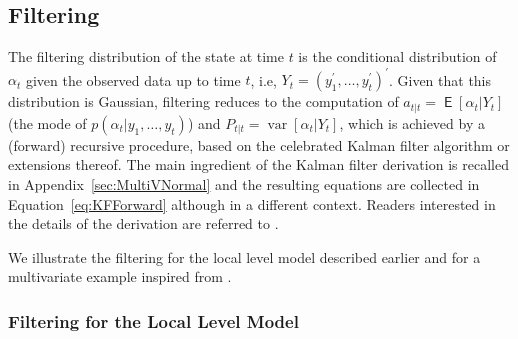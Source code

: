 \documentclass{article}
\DeclareMathOperator{\var}{var}
\DeclareMathOperator{\E}{\mathsf{E}}
\begin{document}
\subsection{Filtering}

The filtering distribution of the state at time $t$ is the conditional distribution of
$\alpha_t$ given the observed data up to time $t$, i.e,
$Y_t=(y_1^\prime,\dots,y_t^\prime)^\prime$. Given that this distribution is Gaussian,
filtering reduces to the computation of $a_{t|t}=\E[\alpha_t|Y_t]$ (the mode of
$p(\alpha_t|y_1,\dots,y_t)$) and $P_{t|t}=\var[\alpha_t|Y_t]$, which is achieved by a
(forward) recursive procedure, based on the celebrated Kalman filter algorithm or extensions
thereof.  The main ingredient of the Kalman filter derivation is recalled in
Appendix~\ref{sec:MultiVNormal} and the resulting equations are collected in
Equation~\eqref{eq:KFForward} although in a different context. Readers interested in the
details of the derivation are referred to \citet[chap. 4]{durbin2012time}.

We illustrate the filtering for the local level model described earlier and for a
multivariate example inspired from \citet[chap. 3.3.2]{petris2009dynamic}.

\subsubsection{Filtering for the Local Level Model}
\end{document}
